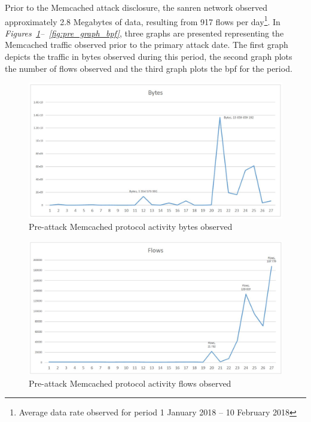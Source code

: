 Prior to the Memcached attack disclosure, the \gls{sanren} network observed approximately 2.8 Megabytes of data, resulting from 917 flows per day\footnote{Average data rate observed for period 1 January 2018 -- 10 February 2018}. In \textit{Figures~\ref{fig:pre_graph_bytes}--~\ref{fig:pre_graph_bpf}}, three graphs are presented representing the Memcached traffic observed prior to the primary attack date. The first graph depicts the traffic in bytes observed during this period, the second graph plots the number of flows observed and the third graph plots the \gls{bpf} for the period.

\begin{figure}
    \centering
    \includegraphics[width=\columnwidth]{section_4/memcached_pre-attack_bytes.JPG}
    \caption{Pre-attack Memcached protocol activity bytes observed}
    \label{fig:pre_graph_bytes}
\end{figure}

\begin{figure}
    \centering
    \includegraphics[width=\columnwidth]{section_4/memcached_pre-attack_flows.JPG}
    \caption{Pre-attack Memcached protocol activity flows observed }
    \label{fig:pre_graph_flows}
\end{figure}

